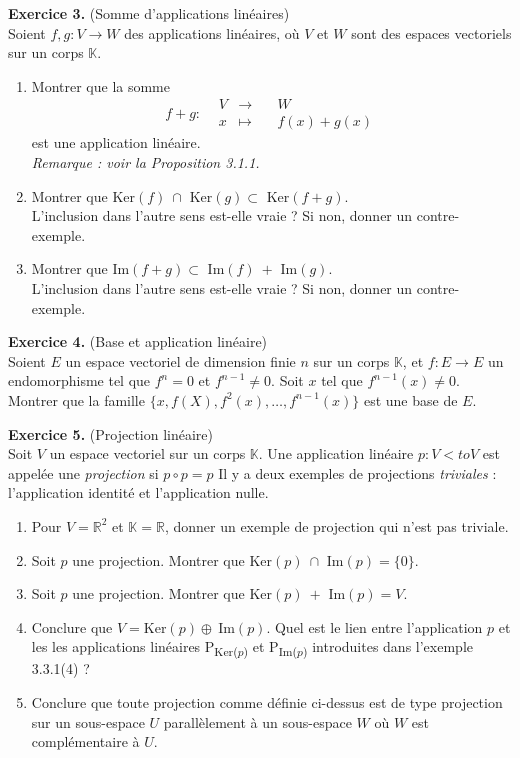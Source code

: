 \documentclass[a4paper, 10pt]{report}
\begin{document}
	\vspace{5mm}
	\noindent
	\textbf{Exercice 3.} (Somme d'applications linéaires)\\
	Soient $f, g: V \to W$ des applications linéaires, où $V$ et $W$
	sont des espaces vectoriels sur un corps $\mathbb{K}$.
	\begin{enumerate}[label=\arabic*.]
		\item Montrer que la somme
		\[
			f+g: \begin{aligned}
				&V &\to& \quad W\\
				&x &\mapsto&\quad f(x)+g(x)
			\end{aligned}
		\]
		est une application linéaire.\\
		\textit{Remarque : voir la Proposition 3.1.1.}
		\item Montrer que Ker$(f)\ \cap$ Ker$(g) \subset$ Ker$(f+g)$.\\
		L'inclusion dans l'autre sens est-elle vraie ? Si non, donner
		un contre-exemple.
		\item Montrer que Im$(f+g) \subset$ Im$(f)\ +$ Im$(g)$.\\
		L'inclusion dans l'autre sens est-elle vraie ? Si non, donner
		un contre-exemple.
	\end{enumerate}
	
	\newpage
	
	\vspace{5mm}
	\noindent
	\textbf{Exercice 4.} (Base et application linéaire)\\
	Soient $E$ un espace vectoriel de dimension finie $n$ sur un corps
	$\mathbb{K}$, et $f: E \to E$ un endomorphisme tel que $f^n = 0$
	et $f^{n-1} \neq 0$. Soit $x$ tel que $f^{n-1}(x) \neq 0$. Montrer
	que la famille $\{x, f(X), f^2(x), \dotsc, f^{n-1}(x)\}$ est une
	base de $E$.
	
	\vspace{5mm}
	\noindent
	\textbf{Exercice 5.} (Projection linéaire)\\
	Soit $V$ un espace vectoriel sur un corps $\mathbb{K}$. Une
	application linéaire $p: V <to V$ est appelée une \textit{projection}
	si $p \circ p = p$ Il y a deux exemples de projections
	\textit{triviales} : l'application identité et l'application nulle.
	\begin{enumerate}[label=\arabic*.]
		\item Pour $V = \mathbb{R}^2$ et $\mathbb{K} = \mathbb{R}$,
		donner un exemple de projection qui n'est pas triviale.
		\item Soit $p$ une projection. Montrer que Ker$(p)\ \cap$ Im$(p)
			= \{0\}$.
		\item Soit $p$ une projection. Montrer que Ker$(p)\ +$ Im$(p)
			= V$.
		\item Conclure que $V = $Ker$(p) \oplus\ $Im$(p)$. Quel est le
		lien entre l'application $p$ et les les applications linéaires
		P\textsubscript{Ker($p$)} et P\textsubscript{Im($p$)} introduites dans l'exemple 3.3.1(4) ?
		\item Conclure que toute projection comme définie ci-dessus est de
		type projection sur un sous-espace $U$ parallèlement à un
		sous-espace $W$ où $W$ est complémentaire à $U$. 
	\end{enumerate}
	
\end{document}
